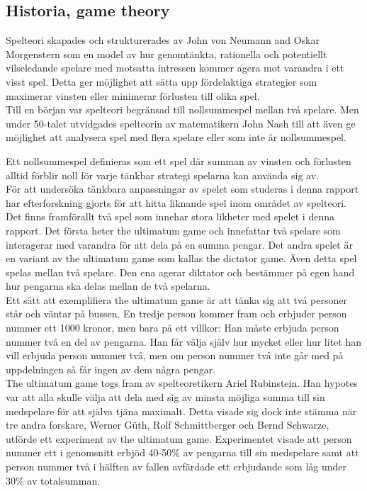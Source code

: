 \subsection{Historia, game theory}
Spelteori skapades och strukturerades av John von Neumann and Oskar Morgenstern som en model av hur genomtänkta, rationella och potentiellt vilseledande spelare med motsatta intressen kommer agera mot varandra i ett visst spel. Detta ger möjlighet att sätta upp fördelaktiga strategier som maximerar vinsten eller minimerar förlusten till olika spel.\\

\noindent Till en början var spelteori begränsad till nollsummespel\* mellan två spelare. Men under 50-talet utvidgades spelteorin av matematikern John Nash till att även ge möjlighet att analysera spel med flera spelare eller som inte är nollsummespel. 

\*Ett nollsummespel definieras som ett spel där summan av vinsten och förlusten alltid förblir noll för varje tänkbar strategi spelarna kan använda sig av.\\

\noindent För att undersöka tänkbara anpassningar av spelet som studeras i denna rapport har efterforskning gjorts för att hitta liknande spel inom området av spelteori. Det finns framförallt två spel som innehar stora likheter med spelet i denna rapport. Det första heter the ultimatum game och innefattar två spelare som interagerar med varandra för att dela på en summa pengar. Det andra spelet är en variant av the ultimatum game som kallas the dictator game. Även detta spel spelas mellan två spelare. Den ena agerar diktator och bestämmer på egen hand hur pengarna ska delas mellan de två spelarna.\\

\noindent Ett sätt att exemplifiera the ultimatum game är att tänka sig att två personer står och väntar på bussen. En tredje person kommer fram och erbjuder person nummer ett 1000 kronor, men bara på ett villkor: Han måste erbjuda person nummer två en del av pengarna. Han får välja själv hur mycket eller hur litet han vill erbjuda person nummer två, men om person nummer två inte går med på uppdelningen så får ingen av dem några pengar.\\

\noindent The ultimatum game togs fram av spelteoretikern Ariel Rubinstein. Han hypotes var att alla skulle välja att dela med sig av minsta möjliga summa till sin medspelare för att själva tjäna maximalt. Detta visade sig dock inte stämma när tre andra forskare, Werner Güth, Rolf Schmittberger och Bernd Schwarze, utförde ett experiment av the ultimatum game. Experimentet visade att person nummer ett i genomsnitt erbjöd 40-50\% av pengarna till sin medspelare samt att person nummer två i hälften av fallen avfärdade ett erbjudande som låg under 30\% av totalsumman.\\

